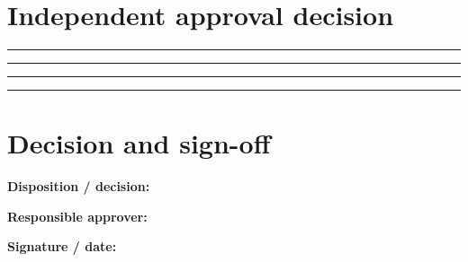 \documentclass[10pt,letterpaper]{article}
\begin{document}
\section{Independent approval decision}
\noindent\rule{\linewidth}{0.4pt}\par\vspace{16pt}
\noindent\rule{\linewidth}{0.4pt}\par\vspace{16pt}
\noindent\rule{\linewidth}{0.4pt}\par\vspace{16pt}
\noindent\rule{\linewidth}{0.4pt}\par\vspace{16pt}
\section{Decision and sign-off}
\noindent\textbf{Disposition / decision:}\quad\hrulefill\par\vspace{11pt}
\noindent\textbf{Responsible approver:}\quad\hrulefill\par\vspace{11pt}
\noindent\textbf{Signature / date:}\quad\hrulefill\par\vspace{11pt}
\end{document}
